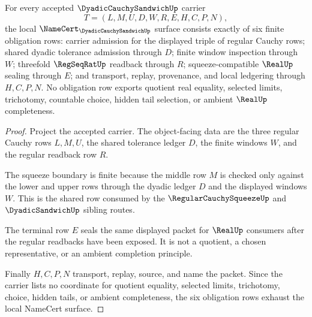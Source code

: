 \begin{theorem}
\label{thm:dyadic-cauchy-sandwich-namecert-obligations}
For every accepted $\DyadicCauchySandwichUp$ carrier
$$
T=(L,M,U,D,W,R,E,H,C,P,N),
$$
the local $\NameCert_{\DyadicCauchySandwichUp}$ surface consists exactly of six finite obligation rows: carrier admission for the displayed triple of regular Cauchy rows; shared dyadic tolerance admission through $D$; finite window inspection through $W$; threefold $\RegSeqRatUp$ readback through $R$; squeeze-compatible $\RealUp$ sealing through $E$; and transport, replay, provenance, and local ledgering through $H,C,P,N$. No obligation row exports quotient real equality, selected limits, trichotomy, countable choice, hidden tail selection, or ambient $\RealUp$ completeness.
\end{theorem}
\begin{proof}
Project the accepted carrier. The object-facing data are the three regular Cauchy rows $L,M,U$, the shared tolerance ledger $D$, the finite windows $W$, and the regular readback row $R$.

The squeeze boundary is finite because the middle row $M$ is checked only against the lower and upper rows through the dyadic ledger $D$ and the displayed windows $W$. This is the shared row consumed by the $\RegularCauchySqueezeUp$ and $\DyadicSandwichUp$ sibling routes.

The terminal row $E$ seals the same displayed packet for $\RealUp$ consumers after the regular readbacks have been exposed. It is not a quotient, a chosen representative, or an ambient completion principle.

Finally $H,C,P,N$ transport, replay, source, and name the packet. Since the carrier lists no coordinate for quotient equality, selected limits, trichotomy, choice, hidden tails, or ambient completeness, the six obligation rows exhaust the local NameCert surface.
\end{proof}

